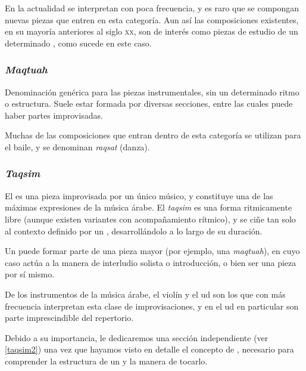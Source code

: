         En la actualidad se interpretan con poca frecuencia, y es raro que se compongan nuevas piezas que entren en esta categoría. Aun así las composiciones existentes, en su mayoría anteriores al siglo \textsc{xx}, son de interés como piezas de estudio de un determinado \maqam, como sucede en este caso.


    \subsubsection{\emph{Maqtuah}}

        Denominación genérica para las piezas instrumentales, sin un determinado ritmo o estructura. Suele estar formada por diversas secciones, entre las cuales puede haber partes improvisadas.

        Muchas de las composiciones que entran dentro de esta categoría se utilizan para el baile, y se denominan \emph{raqsat} (danza).


    \subsubsection{\emph{Taqsim}}

        El \taqsim es una pieza improvisada por un único músico, y constituye una de las máximas expresiones de la música árabe. El \emph{taqsim} es una forma ritmicamente libre (aunque existen variantes con acompañamiento rítmico), y se ciñe tan solo al contexto definido por un \maqam, desarrollándolo a lo largo de su duración.

        Un \taqsim puede formar parte de una pieza mayor (por ejemplo, una \emph{maqtuah}), en cuyo caso actúa a la manera de interludio solista o introducción, o bien ser una pieza por sí mismo.

        De los instrumentos de la música árabe, el violín y el ud son los que con más frecuencia interpretan esta clase de improvisaciones, y en el ud en particular son parte imprescindible del repertorio.

        Debido a su importancia, le dedicaremos una sección independiente (ver \ref{taqsim2}) una vez que hayamos visto en detalle el concepto de \maqam, necesario para comprender la estructura de un \taqsim y la manera de tocarlo.


